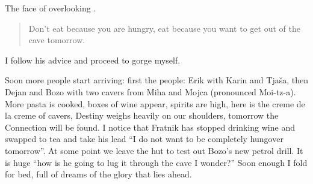 \begin{marginfigure}
\checkoddpage \ifoddpage \forcerectofloat \else \forceversofloat \fi
\centering
 \caption{The face of  overlooking . }
 \label{mig kal}
\end{marginfigure}

\begin{quote} Don't eat because you are hungry, eat because you want to get out of the cave tomorrow. \end{quote}

I follow his advice and proceed to gorge myself.

Soon more people start arriving: first the  people: Erik with
Karin and Tja\v{s}a, then Dejan and Bozo with two cavers from 
Miha and Mojca (pronounced Moi-tz-a). More pasta is cooked, boxes of
wine appear, spirits are high, here is the creme de la creme of
cavers, Destiny weighs heavily on our shoulders, tomorrow the Connection
will be found. I notice that Fratnik has stopped drinking wine and
swapped to tea and take his lead ``I do not want to be completely
hungover tomorrow''. At some point we leave the hut to test out Bozo's
new petrol drill. It is huge ``how is he going to lug it through the
cave I wonder?'' Soon enough I fold for bed, full of dreams of the glory
that lies ahead.

